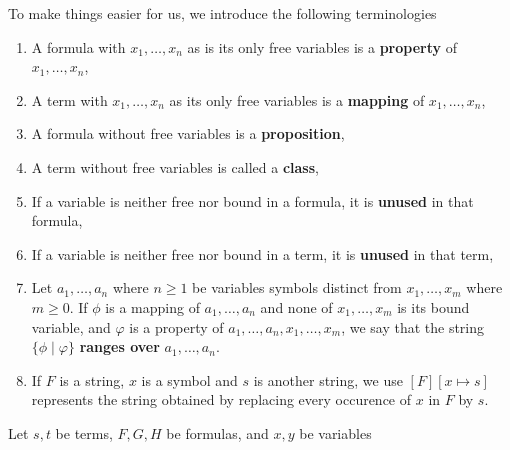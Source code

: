 \documentclass[11pt]{book}
\newcommand{\env}[2]{\begin{#1}#2\end{#1}}
\begin{document}
\begin{remark}To make things easier for us, we introduce the following terminologies
\env{enumerate}{
	\item A formula with $x_1,\dots,x_n$ as is its only free variables is a \textbf{property} of $x_1,\dots,x_n$,
	\item A term with $x_1,\dots,x_n$ as its only free variables is a \textbf{mapping} of $x_1,\dots,x_n$,
	\item A formula without free variables is a \textbf{proposition},
	\item A term without free variables is called a \textbf{class},
	\item If a variable is neither free nor bound in a formula, it is \textbf{unused} in that formula,
	\item If a variable is neither free nor bound in a term, it is \textbf{unused} in that term,
	\item Let $a_1,\dots,a_n$ where $n\ge 1$ be variables symbols distinct from $x_1,\dots,x_m$ where $m\ge 0$. If $\phi$ is a mapping of $a_1,\dots,a_n$ and none of $x_1,\dots,x_m$ is its bound variable, and $\varphi$ is a property of $a_1,\dots,a_n,x_1,\dots,x_m$, we say that the string $\{\phi\mid\varphi\}$ \textbf{ranges over} $a_1,\dots,a_n$.
	\item If $F$ is a string, $x$ is a symbol and $s$ is another string, we use $[F][x\mapsto s]$ represents the string obtained by replacing every occurence of $x$ in $F$ by $s$.
	\iffalse
	\item If $F$ is a tautology in propositional language with proposition variables $A_1,\dots,A_n$ and $B_1,\dots,B_n$ are formulas in first order language, then we say that $[F][A_1\mapsto B_1]\cdots [A_n\mapsto B_n]$ is a \textbf{tautology} in first order language. If $G$ is a proposition in first order language, we write $\vDash G$ to indicate that $G$ is a tautology in first order language.\fi
}
\end{remark}
\iffalse
\noindent Let $s,t$ be terms, $F,G,H$ be formulas, and $x,y$ be variables
\end{document}
